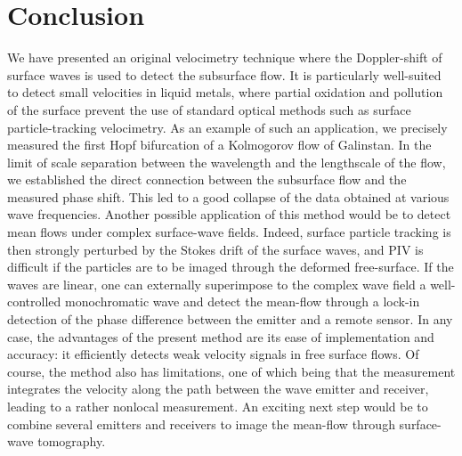 \documentclass[doublecol]{epl2} %
\begin{document}
\section{Conclusion}
We have presented an original velocimetry technique where the Doppler-shift of surface waves is used to detect the subsurface flow. It is particularly well-suited to detect small velocities in liquid metals, where partial oxidation and pollution of the surface prevent the use of standard optical methods such as surface particle-tracking velocimetry. As an example of such an application, we precisely measured the first Hopf bifurcation of a Kolmogorov flow of Galinstan. 
In the limit of scale separation between the wavelength and the lengthscale of the flow, we established the direct connection between the subsurface flow and the measured phase shift. This led to a good collapse of the data obtained at various wave frequencies.
Another possible application of this method would be to detect mean flows under complex surface-wave fields. Indeed, surface particle tracking is then strongly perturbed by the Stokes drift of the surface waves, and PIV is difficult if the particles are to be imaged through the deformed free-surface. If the waves are linear, one can externally superimpose to the complex wave field a well-controlled monochromatic wave and detect the mean-flow through a lock-in detection of the phase difference between the emitter and a remote sensor. In any case, the advantages of the present method are its ease of implementation and accuracy: it efficiently detects weak velocity signals in free surface flows. Of course, the method also has limitations, one of which being that the measurement integrates the velocity along the path between the wave emitter and receiver, leading to a rather nonlocal measurement. An exciting next step would be to combine several emitters and receivers to image the mean-flow through surface-wave tomography.
\end{document}
